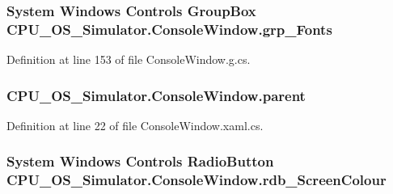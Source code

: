 \subsubsection[{grp\+\_\+\+Fonts}]{\setlength{\rightskip}{0pt plus 5cm}System Windows Controls Group\+Box C\+P\+U\+\_\+\+O\+S\+\_\+\+Simulator.\+Console\+Window.\+grp\+\_\+\+Fonts\hspace{0.3cm}{\ttfamily [package]}}\label{class_c_p_u___o_s___simulator_1_1_console_window_a2d8d6d1f3ee210b44e0eabd3c063438d}


Definition at line 153 of file Console\+Window.\+g.\+cs.

\hypertarget{class_c_p_u___o_s___simulator_1_1_console_window_a1e38326bb40f4ed44c4964d94dc6f809}{}
\subsubsection[{parent}]{ C\+P\+U\+\_\+\+O\+S\+\_\+\+Simulator.\+Console\+Window.\+parent\hspace{0.3cm}{\ttfamily [private]}}\label{class_c_p_u___o_s___simulator_1_1_console_window_a1e38326bb40f4ed44c4964d94dc6f809}


Definition at line 22 of file Console\+Window.\+xaml.\+cs.

\hypertarget{class_c_p_u___o_s___simulator_1_1_console_window_a1ce1d3ba71dbca9bee53bf6b9c474787}{}
\subsubsection[{rdb\+\_\+\+Screen\+Colour}]{\setlength{\rightskip}{0pt plus 5cm}System Windows Controls Radio\+Button C\+P\+U\+\_\+\+O\+S\+\_\+\+Simulator.\+Console\+Window.\+rdb\+\_\+\+Screen\+Colour\hspace{0.3cm}{\ttfamily [package]}}\label{class_c_p_u___o_s___simulator_1_1_console_window_a1ce1d3ba71dbca9bee53bf6b9c474787}


